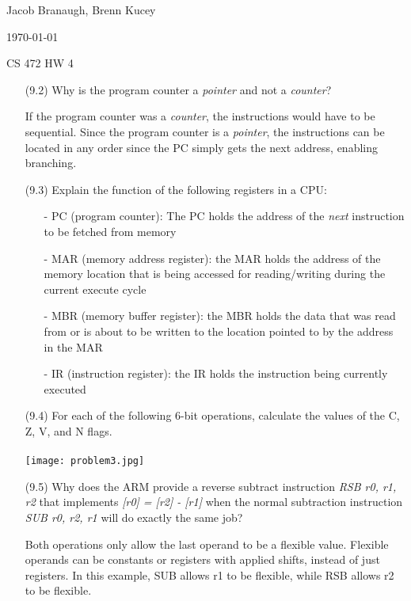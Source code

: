 \documentclass[letterpaper,10pt,titlepage]{article}
\def\name{Jacob Branaugh, Brenn Kucey}
\begin{document}
\hfill \name

\hfill \today

\hfill CS 472 HW 4

\begin{enumerate}
	\item[(9.2)] Why is the program counter a \textit{pointer} and not a
		\textit{counter}?
	\item[\textbullet] If the program counter was a \textit{counter}, the instructions
		would have to be sequential. Since the program counter is a
		\textit{pointer}, the instructions can be located in any order since the
		PC simply gets the next address, enabling branching.

	\item[(9.3)] Explain the function of the following registers in a CPU:
	\begin{enumerate}
		\item[-] PC (program counter): The PC holds the address of the
			\textit{next} instruction to be fetched from memory
		\item[-] MAR (memory address register): the MAR holds the address of the
			memory location that is being accessed for reading/writing during 
			the current execute cycle
		\item[-] MBR (memory buffer register): the MBR holds the data that was
			read from or is about to be written to the location pointed to by
			the address in the MAR
		\item[-] IR (instruction register): the IR holds the instruction being
			currently executed
	\end{enumerate}

	\item[(9.4)] For each of the following 6-bit operations, calculate the values of
		the C, Z, V, and N flags.
		\\
		\\
		\texttt{[image: problem3.jpg]}

	\item[(9.5)] Why does the ARM provide a reverse subtract instruction \textit{RSB
		r0, r1, r2} that implements \textit{[r0] = [r2] - [r1]} when the normal
		subtraction instruction \textit{SUB  r0, r2, r1} will do exactly the same
		job?
	\item[\textbullet] Both operations only allow the last operand to be a flexible
		value. Flexible operands can be constants or registers with applied 
		shifts, instead of just registers. In this example, SUB allows r1 to be 
		flexible, while RSB allows r2 to be flexible. 


\end{enumerate}
\end{document}

